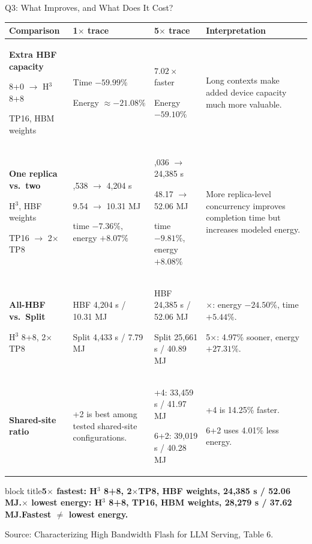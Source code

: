 \documentclass[aspectratio=169,10pt]{beamer}
\newcommand{\takeaway}[1]{\par\vspace{.12cm}\begin{beamercolorbox}[rounded=true,sep=.12cm,wd=\linewidth]{block title}\small\bfseries #1\end{beamercolorbox}}
\newcommand{\src}[1]{\par\vfill{\fontsize{7}{8}\selectfont\color{Muted}Source: Characterizing High Bandwidth Flash for LLM Serving, #1.}\par}
\renewcommand{\arraystretch}{1.15}
\begin{document}
\begin{frame}[t]{Q3: What Improves, and What Does It Cost?}

\footnotesize\setlength{\parskip}{0pt}
\setlength{\tabcolsep}{3.5pt}
\renewcommand{\arraystretch}{1.0}
\begin{tabularx}{\textwidth}{@{}>{\raggedright\arraybackslash}p{3.25cm}>{\raggedright\arraybackslash}X>{\raggedright\arraybackslash}X>{\raggedright\arraybackslash}p{4.05cm}@{}}\toprule
\textbf{Comparison} & \textbf{1$\times$ trace} & \textbf{5$\times$ trace} & \textbf{Interpretation}\\\midrule
\textbf{Extra HBF capacity}\par 8+0 $\rightarrow$ H$^3$ 8+8\par TP16, HBM weights
& Time $-59.99\%$\par Energy $\approx -21.08\%$
& $7.02\times$ faster\par Energy $-59.10\%$
& Long contexts make added device capacity much more valuable.\\\midrule
\textbf{One replica vs.\ two}\par H$^3$, HBF weights\par TP16 $\rightarrow$ 2$\times$TP8
& 4,538 $\rightarrow$ 4,204 s\par 9.54 $\rightarrow$ 10.31 MJ\par time $-7.36\%$, energy $+8.07\%$
& 27,036 $\rightarrow$ 24,385 s\par 48.17 $\rightarrow$ 52.06 MJ\par time $-9.81\%$, energy $+8.08\%$
& More replica-level concurrency improves completion time but increases modeled energy.\\\midrule
\textbf{All-HBF vs.\ Split}\par H$^3$ 8+8, 2$\times$TP8
& HBF 4,204 s / 10.31 MJ\par Split 4,433 s / 7.79 MJ
& HBF 24,385 s / 52.06 MJ\par Split 25,661 s / 40.89 MJ
& 1$\times$: energy $-24.50\%$, time $+5.44\%$.\par 5$\times$: 4.97\% sooner, energy $+27.31\%$.\\\midrule
\textbf{Shared-site ratio}
& 6+2 is best among tested shared-site configurations.
& 4+4: 33,459 s / 41.97 MJ\par 6+2: 39,019 s / 40.28 MJ
& 4+4 is 14.25\% faster.\par 6+2 uses 4.01\% less energy.\\\bottomrule
\end{tabularx}
\vspace{-6pt}
\takeaway{5$\times$ fastest: H$^3$ 8+8, 2$\times$TP8, HBF weights, 24,385 s / 52.06 MJ.\quad 5$\times$ lowest energy: H$^3$ 8+8, TP16, HBM weights, 28,279 s / 37.62 MJ.\quad Fastest $\neq$ lowest energy.}
\src{Table 6}
\end{frame}
\end{document}
